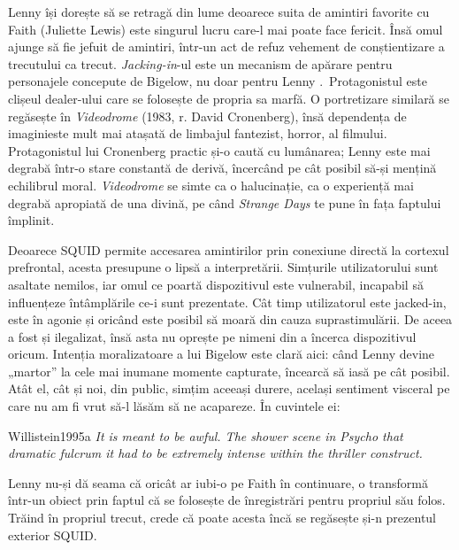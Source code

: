 \documentclass[12pt]{article}
\begin{document}
Lenny își dorește să se retragă din lume deoarece suita de amintiri favorite cu Faith (Juliette Lewis) este singurul lucru care-l mai poate face fericit. Însă omul ajunge să fie jefuit de amintiri, într-un act de refuz vehement de conștientizare a trecutului ca trecut. \textit{Jacking-in}-ul este un mecanism de apărare pentru personajele concepute de Bigelow, nu doar pentru Lenny \cite{Palermo2020a}. Protagonistul este clișeul dealer-ului care se folosește de propria sa marfă. O portretizare similară se regăsește în \textit{Videodrome} (1983, r. David Cronenberg), însă \dedouble dependența de imagini\sqtworight este mult mai atașată de limbajul fantezist, horror, al filmului. Protagonistul lui Cronenberg practic și-o caută cu lumânarea; Lenny este mai degrabă într-o stare constantă de derivă, încercând pe cât posibil să-și mențină echilibrul moral. \textit{Videodrome} se simte ca o halucinație, ca o experiență mai degrabă apropiată de una divină, pe când \textit{Strange Days} te pune în fața faptului împlinit.\par

Deoarece SQUID permite accesarea amintirilor prin conexiune directă la cortexul prefrontal, acesta presupune o lipsă a interpretării. Simțurile utilizatorului sunt asaltate nemilos, iar omul ce poartă dispozitivul este vulnerabil, incapabil să influențeze întâmplările ce-i sunt prezentate. Cât timp utilizatorul este jacked-in, este în agonie și oricând este posibil să moară din cauza suprastimulării. De aceea a fost și ilegalizat, însă asta nu oprește pe nimeni din a încerca dispozitivul oricum. Intenția moralizatoare a lui Bigelow este clară aici: când Lenny devine „martor” la cele mai inumane momente capturate, încearcă să iasă pe cât posibil. Atât el, cât și noi, din public, simțim aceeași durere, același sentiment visceral pe care nu am fi vrut să-l lăsăm să ne acapareze. În cuvintele ei:\par

\begin{displaycquote}{Willistein1995a}
	\textit{It is meant to be awful. The shower scene in \textit{Psycho} \textemdash that dramatic fulcrum \textemdash it had to be extremely intense within the thriller construct.}
\end{displaycquote}

Lenny nu-și dă seama că oricât ar iubi-o pe Faith în continuare, o transformă într-un obiect prin faptul că se folosește de înregistrări pentru propriul său folos. Trăind în propriul trecut, crede că poate acesta încă se regăsește și-n prezentul exterior SQUID.\par
\end{document}
